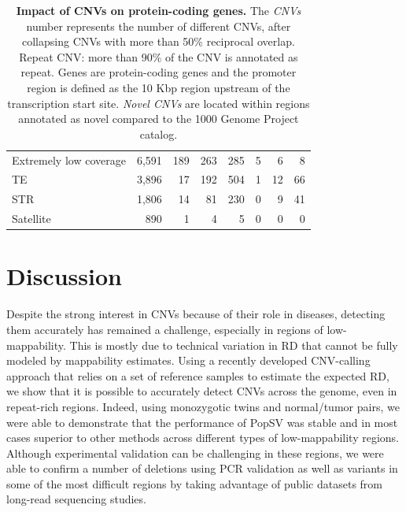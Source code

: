 \begin{table}[htp]
{\begin{tabular}{|l|r|r|r|r|r|r|r|}
      Extremely low coverage               & 6,591                 & 189                                  & 263        & 285      & 5     & 6          & 8        \\
      TE                                   & 3,896                 & 17                                   & 192        & 504      & 1     & 12         & 66       \\
      STR                                  & 1,806                 & 14                                   & 81         & 230      & 0     & 9          & 41       \\
      Satellite                            & 890                   & 1                                    & 4          & 5        & 0     & 0          & 0        \\
      \hline
    \end{tabular}
  }
  \caption[Impact of CNVs on protein-coding genes.]{{\bf Impact of CNVs on protein-coding genes.} {\small The {\it CNVs} number represents the number of different CNVs, after collapsing CNVs with more than 50\% reciprocal overlap. Repeat CNV: more than 90\% of the CNV is annotated as repeat. Genes are protein-coding genes and the promoter region is defined as the 10 Kbp region upstream of the transcription start site. {\it Novel CNVs} are located within regions annotated as novel compared to the 1000 Genome Project catalog.}}
  \label{tab:gene}
\end{table}

\section{Discussion}

Despite the strong interest in CNVs because of their role in diseases, detecting them accurately has remained a challenge, especially in regions of low-mappability. This is mostly due to technical variation in RD that cannot be fully modeled by mappability estimates.
Using a recently developed CNV-calling approach that relies on a set of reference samples to estimate the expected RD\cite{Monlong2018}, we show that it is possible to accurately detect CNVs across the genome, even in repeat-rich regions.
Indeed, using monozygotic twins and normal/tumor pairs, we were able to demonstrate that the performance of {\sf PopSV} was stable and in most cases superior to other methods across different types of low-mappability regions.
Although experimental validation can be challenging in these regions, we were able to confirm a number of deletions using PCR validation as well as variants in some of the most difficult regions by taking advantage of public datasets from long-read sequencing studies.

